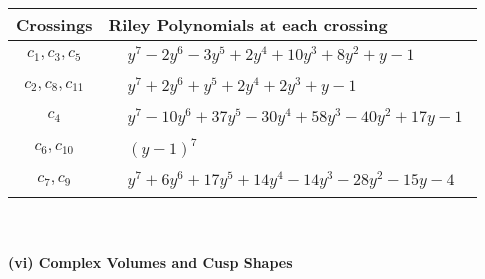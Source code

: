 \documentclass[1p]{elsarticle_modified}
\theoremstyle{definition}
\begin{document}
\begin{tabular}{m{50pt}|m{274pt}}
Crossings & \hspace{64pt}Riley Polynomials at each crossing \\
\hline $$\begin{aligned}c_{1},c_{3},c_{5}\end{aligned}$$&$\begin{aligned}
&y^7-2 y^6-3 y^5+2 y^4+10 y^3+8 y^2+y-1
\end{aligned}$\\
\hline $$\begin{aligned}c_{2},c_{8},c_{11}\end{aligned}$$&$\begin{aligned}
&y^7+2 y^6+y^5+2 y^4+2 y^3+y-1
\end{aligned}$\\
\hline $$\begin{aligned}c_{4}\end{aligned}$$&$\begin{aligned}
&y^7-10 y^6+37 y^5-30 y^4+58 y^3-40 y^2+17 y-1
\end{aligned}$\\
\hline $$\begin{aligned}c_{6},c_{10}\end{aligned}$$&$\begin{aligned}
&(y-1)^7
\end{aligned}$\\
\hline $$\begin{aligned}c_{7},c_{9}\end{aligned}$$&$\begin{aligned}
&y^7+6 y^6+17 y^5+14 y^4-14 y^3-28 y^2-15 y-4
\end{aligned}$\\
\hline
\end{tabular}\\~\\
\newpage\flushleft \textbf{(vi) Complex Volumes and Cusp Shapes}
\end{document}
